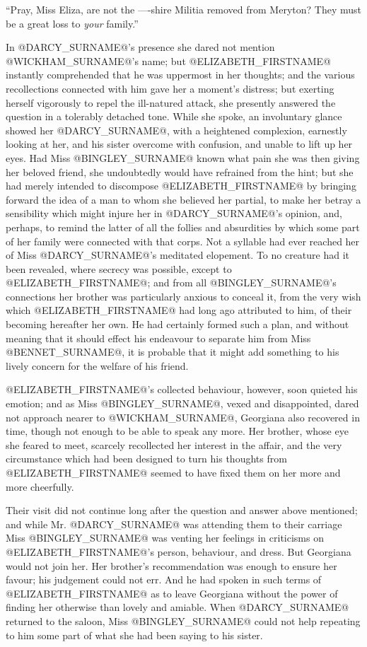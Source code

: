 ``Pray, Miss Eliza, are not the ----shire Militia removed from Meryton?
They must be a great loss to \textit{your} family.''

In @DARCY_SURNAME@'s presence she dared not mention @WICKHAM_SURNAME@'s name; but @ELIZABETH_FIRSTNAME@
instantly comprehended that he was uppermost in her thoughts; and the
various recollections connected with him gave her a moment's distress;
but exerting herself vigorously to repel the ill-natured attack, she
presently answered the question in a tolerably detached tone. While
she spoke, an involuntary glance showed her @DARCY_SURNAME@, with a heightened
complexion, earnestly looking at her, and his sister overcome with
confusion, and unable to lift up her eyes. Had Miss @BINGLEY_SURNAME@ known what
pain she was then giving her beloved friend, she undoubtedly would
have refrained from the hint; but she had merely intended to discompose
@ELIZABETH_FIRSTNAME@ by bringing forward the idea of a man to whom she believed
her partial, to make her betray a sensibility which might injure her in
@DARCY_SURNAME@'s opinion, and, perhaps, to remind the latter of all the follies
and absurdities by which some part of her family were connected
with that corps. Not a syllable had ever reached her of Miss @DARCY_SURNAME@'s
meditated elopement. To no creature had it been revealed, where secrecy
was possible, except to @ELIZABETH_FIRSTNAME@; and from all @BINGLEY_SURNAME@'s connections
her brother was particularly anxious to conceal it, from the very
wish which @ELIZABETH_FIRSTNAME@ had long ago attributed to him, of their becoming
hereafter her own. He had certainly formed such a plan, and without
meaning that it should effect his endeavour to separate him from Miss
@BENNET_SURNAME@, it is probable that it might add something to his lively concern
for the welfare of his friend.

@ELIZABETH_FIRSTNAME@'s collected behaviour, however, soon quieted his emotion; and
as Miss @BINGLEY_SURNAME@, vexed and disappointed, dared not approach nearer to
@WICKHAM_SURNAME@, Georgiana also recovered in time, though not enough to be able
to speak any more. Her brother, whose eye she feared to meet, scarcely
recollected her interest in the affair, and the very circumstance which
had been designed to turn his thoughts from @ELIZABETH_FIRSTNAME@ seemed to have
fixed them on her more and more cheerfully.

Their visit did not continue long after the question and answer above
mentioned; and while Mr. @DARCY_SURNAME@ was attending them to their carriage Miss
@BINGLEY_SURNAME@ was venting her feelings in criticisms on @ELIZABETH_FIRSTNAME@'s person,
behaviour, and dress. But Georgiana would not join her. Her brother's
recommendation was enough to ensure her favour; his judgement could not
err. And he had spoken in such terms of @ELIZABETH_FIRSTNAME@ as to leave Georgiana
without the power of finding her otherwise than lovely and amiable. When
@DARCY_SURNAME@ returned to the saloon, Miss @BINGLEY_SURNAME@ could not help repeating to
him some part of what she had been saying to his sister.

